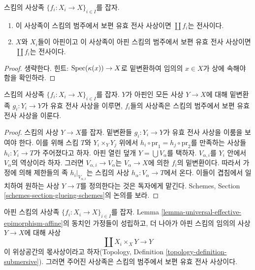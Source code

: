 \begin{lemma}
\label{lemma-universal-effective-epimorphism-surjective}
스킴의 사상족 $\{f_i : X_i \to X\}_{i \in I}$를 잡자.
\begin{enumerate}
\item 이 사상족이 스킴의 범주에서 보편 유효 전사 사상이면
$\coprod f_i$는 전사이다.
\item $X$와 $X_i$들이 아핀이고 이 사상족이 아핀 스킴의 범주에서 보편
유효 전사 사상이면 $\coprod f_i$는 전사이다.
\end{enumerate}
\end{lemma}

\begin{proof}
생략한다. 힌트: $\mathop{\mathrm{Spec}}(\kappa(x)) \to X$로 밑변환하여 임의의
$x \in X$가 상에 속해야 함을 확인하라.
\end{proof}

\begin{lemma}
\label{lemma-check-universal-effective-epimorphism-affine}
스킴의 사상족 $\{f_i : X_i \to X\}_{i \in I}$를 잡자.
$Y$가 아핀인 모든 사상 $Y \to X$에 대해 밑변환족
$g_i : Y_i \to Y$가 유효 전사 사상을 이루면, $f_i$들의 사상족은
스킴의 범주에서 보편 유효 전사 사상을 이룬다.
\end{lemma}

\begin{proof}
스킴의 사상 $Y \to X$를 잡자. 밑변환들 $g_i : Y_i \to Y$가 유효 전사
사상을 이룸을 보여야 한다. 이를 위해 스킴 $T$와
$Y_i \times_Y Y_j$ 위에서 $h_i \circ \text{pr}_1 = h_j \circ \text{pr}_2$를
만족하는 사상들 $h_i : Y_i \to T$가 주어졌다고 하자.
아핀 열린 덮개 $Y = \bigcup V_\alpha$를 택하자. $V_{\alpha, i}$를
$Y_i$ 안에서 $V_\alpha$의 역상이라 하자. 그러면
$V_{\alpha, i}  \to V_\alpha$는 $V_\alpha \to X$에 의한 $f_i$의
밑변환이다. 따라서 가정에 의해 제한들의 족 $h_i|_{V_{\alpha, i}}$는
스킴의 사상 $h_\alpha : V_\alpha \to T$에서 온다. 이들이 겹침에서
일치하여 원하는 사상 $Y \to T$를 정의한다는 것은 독자에게 맡긴다.
Schemes, Section \ref{schemes-section-glueing-schemes}의 논의를 보라.
\end{proof}

\begin{lemma}
\label{lemma-universal-effective-epimorphism}
아핀 스킴의 사상족 $\{f_i : X_i \to X\}_{i \in I}$를 잡자.
Lemma \ref{lemma-universal-effective-epimorphism-affine}의 동치인 가정들이
성립하고, 더 나아가 아핀 스킴의 임의의 사상 $Y \to X$에 대해 사상
$$
\coprod X_i \times_X Y \longrightarrow Y
$$
이 위상공간의 몫사상이라고 하자(Topology, Definition
\ref{topology-definition-submersive}). 그러면 주어진 사상족은 스킴의
범주에서 보편 유효 전사 사상이다.
\end{lemma}

